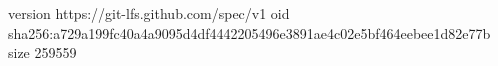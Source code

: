 version https://git-lfs.github.com/spec/v1
oid sha256:a729a199fc40a4a9095d4df4442205496e3891ae4c02e5bf464eebee1d82e77b
size 259559
